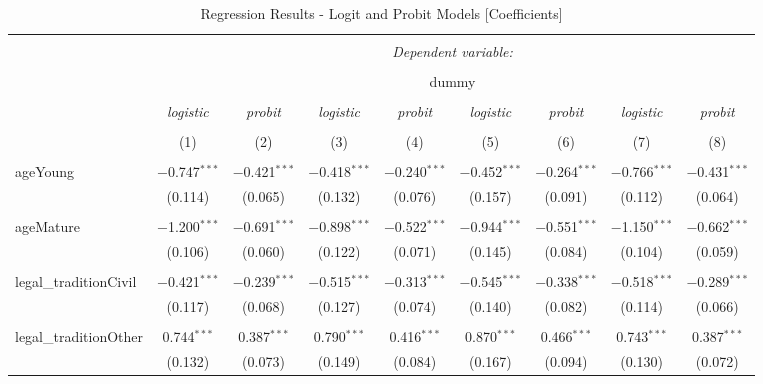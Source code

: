 \documentclass[a4paper, nobind]{templates/ociamthesis}
\begin{document}
\begin{landscape}

\begin{table}[!htbp] \centering 
  \caption{Regression Results - Logit and Probit Models [Coefficients]} 
  \label{} 
\footnotesize 
\begin{tabular}{@{\extracolsep{5pt}}lcccccccc} 
\\[-1.8ex]\hline 
\hline \\[-1.8ex] 
 & \multicolumn{8}{c}{\textit{Dependent variable:}} \\ 
\cline{2-9} 
\\[-1.8ex] & \multicolumn{8}{c}{dummy} \\ 
\\[-1.8ex] & \textit{logistic} & \textit{probit} & \textit{logistic} & \textit{probit} & \textit{logistic} & \textit{probit} & \textit{logistic} & \textit{probit} \\ 
\\[-1.8ex] & (1) & (2) & (3) & (4) & (5) & (6) & (7) & (8)\\ 
\hline \\[-1.8ex] 
 ageYoung & $-$0.747$^{***}$ & $-$0.421$^{***}$ & $-$0.418$^{***}$ & $-$0.240$^{***}$ & $-$0.452$^{***}$ & $-$0.264$^{***}$ & $-$0.766$^{***}$ & $-$0.431$^{***}$ \\ 
  & (0.114) & (0.065) & (0.132) & (0.076) & (0.157) & (0.091) & (0.112) & (0.064) \\ 
  & & & & & & & & \\ 
 ageMature & $-$1.200$^{***}$ & $-$0.691$^{***}$ & $-$0.898$^{***}$ & $-$0.522$^{***}$ & $-$0.944$^{***}$ & $-$0.551$^{***}$ & $-$1.150$^{***}$ & $-$0.662$^{***}$ \\ 
  & (0.106) & (0.060) & (0.122) & (0.071) & (0.145) & (0.084) & (0.104) & (0.059) \\ 
  & & & & & & & & \\ 
 legal\_traditionCivil & $-$0.421$^{***}$ & $-$0.239$^{***}$ & $-$0.515$^{***}$ & $-$0.313$^{***}$ & $-$0.545$^{***}$ & $-$0.338$^{***}$ & $-$0.518$^{***}$ & $-$0.289$^{***}$ \\ 
  & (0.117) & (0.068) & (0.127) & (0.074) & (0.140) & (0.082) & (0.114) & (0.066) \\ 
  & & & & & & & & \\ 
 legal\_traditionOther & 0.744$^{***}$ & 0.387$^{***}$ & 0.790$^{***}$ & 0.416$^{***}$ & 0.870$^{***}$ & 0.466$^{***}$ & 0.743$^{***}$ & 0.387$^{***}$ \\ 
  & (0.132) & (0.073) & (0.149) & (0.084) & (0.167) & (0.094) & (0.130) & (0.072) \\ 

\end{tabular}
\end{table}
\end{landscape}
\end{document}
